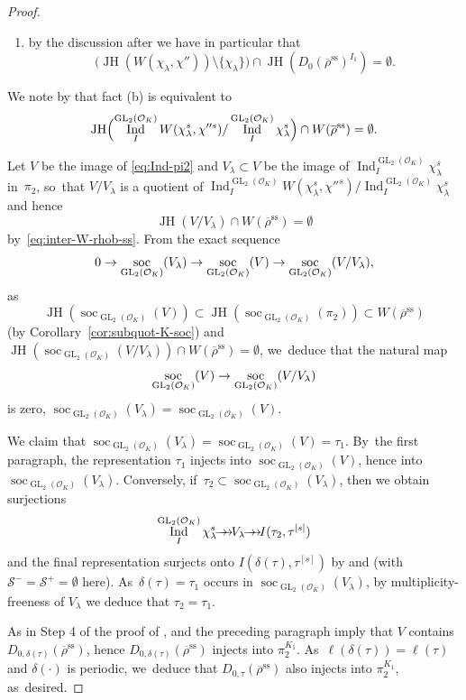 \documentclass[JEP,XML,SOM,Unicode,NoFloatCountersInSection, NoEqCountersInSection,published]{cedram}
\newcommand{\onto}{\mathchoice{\to\hspace*{-5mm}\to}{\mathrel{\hbox{$\to\hspace*{-2.85mm}\to$}}}{\to\hspace*{-3mm}\to}{\to\hspace*{-3mm}\to}}
\newcommand{\cO}{\mathcal{O}}
\renewcommand{\ss}{\mathrm{ss}}
\newcommand{\brho}{\overline{\rho}}
\DeclareMathOperator{\GL}{GL}
\DeclareMathOperator{\Ind}{Ind}
\DeclareMathOperator{\JH}{\mathrm{JH}}
\DeclareMathOperator{\soc}{soc}
\theoremstyle{plain}
\theoremstyle{definition}
\begin{document}
\begin{proof}
\begin{enumerate}
\item[(b)] by the discussion after \cite[Eq.\,(73)]{BHHMS4} we have in particular that
\[
\bigl(\JH(W(\chi_{\lambda},\chi''))\setminus \{\chi_{\lambda}\}\bigr) \cap \JH(D_0(\brho^\ss)^{I_1})=\emptyset.
\]
\end{enumerate}
We note by \cite[Prop.\,4.2]{breuil-buzzati} that fact (b) is equivalent to
\begin{equation}\label{eq:inter-W-rhob-ss}
\JH\Bigl(\Ind_I^{\GL_2(\cO_K)}W(\chi_{\lambda}^s,\chi''^s)/\Ind_I^{\GL_2(\cO_K)} \chi_\lambda^s\Bigr)\cap W(\brho^\ss)=\emptyset.
\end{equation}

Let $V$ be the image of \eqref{eq:Ind-pi2} and $V_{\lambda}\subset V$ be the image of $\Ind_I^{\GL_2(\cO_K)}\chi_{\lambda}^s$ in~$\pi_2$, so~that $V/V_\lambda$ is a quotient of $\Ind_I^{\GL_2(\cO_K)}W(\chi_{\lambda}^s,\chi''^s)/\Ind_I^{\GL_2(\cO_K)} \chi_\lambda^s$ and hence
\[
\JH(V/V_\lambda) \cap W(\brho^\ss)=\emptyset
\]
by~\eqref{eq:inter-W-rhob-ss}.
From the exact sequence
\[
0\to \soc_{\GL_2(\cO_K)}(V_\lambda)\ra\soc_{\GL_2(\cO_K)}(V)\ra\soc_{\GL_2(\cO_K)}(V/V_\lambda),
\]
as
\[
\JH(\soc_{\GL_2(\cO_K)}(V)) \subset \JH(\soc_{\GL_2(\cO_K)}(\pi_2)) \subset W(\brho^\ss)
\]
(by Corollary~\ref{cor:subquot-K-soc}) and $\JH(\soc_{\GL_2(\cO_K)}(V/V_\lambda)) \cap W(\brho^\ss)=\emptyset$, we~deduce that the natural map
\[
\soc_{\GL_2(\cO_K)}(V)\ra\soc_{\GL_2(\cO_K)}(V/V_\lambda)
\]
is zero, \ie $\soc_{\GL_2(\cO_K)}(V_\lambda) = \soc_{\GL_2(\cO_K)}(V)$.

We claim that $\soc_{\GL_2(\cO_K)}(V_\lambda) = \soc_{\GL_2(\cO_K)}(V) = \tau_1$. By~the first paragraph, the representation $\tau_1$ injects into $\soc_{\GL_2(\cO_K)}(V)$, hence into $\soc_{\GL_2(\cO_K)}(V_\lambda)$.
Conversely, if~$\tau_2 \subset \soc_{\GL_2(\cO_K)}(V_\lambda)$, then we obtain surjections
\[
\Ind_I^{\GL_2(\cO_K)} \chi_\lambda^s \onto V_\lambda \onto I(\tau_2,\tau^{[s]})
\]
and the final representation surjects onto $I(\delta(\tau),\tau^{[s]})$ by \cite[Lem.\,12.8(ii)]{BP} and \cite[Lem.\,15.2]{BP} (with $\mathcal S^- = \mathcal S^+ = \emptyset$ here). As~$\delta(\tau) = \tau_1$ occurs in $\soc_{\GL_2(\cO_K)}(V_\lambda)$, by multiplicity-freeness of $V_\lambda$ we deduce that $\tau_2 = \tau_1$.

As in Step 4 of the proof of \cite[Th.\,4.3.15]{BHHMS4}, \cite[Lem.\,4.3.13]{BHHMS4} and the preceding paragraph imply that $V$ contains $D_{0,\delta(\tau)}(\brho^{\ss})$, hence $D_{0,\delta(\tau)}(\brho^{\ss})$ injects into $\pi_2^{K_1}$. As~$\ell(\delta(\tau))=\ell(\tau)$ and $\delta(\cdot)$ is periodic, we~deduce that $D_{0,\tau}(\brho^{\ss})$ also injects into $\pi_2^{K_1}$, as~desired.
\end{proof}
\end{document}
